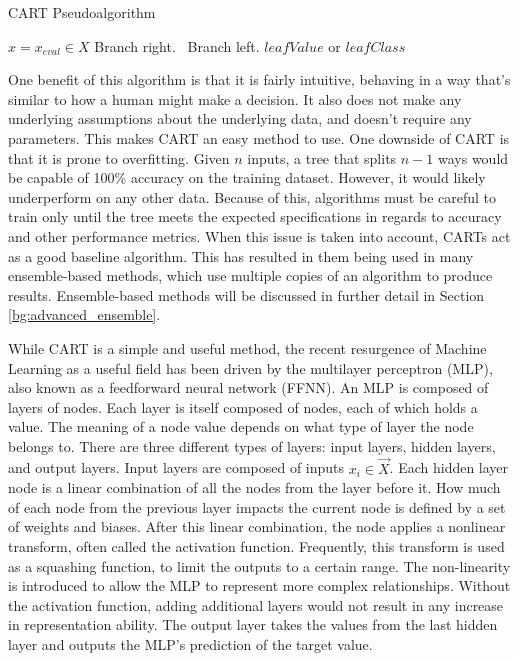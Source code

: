 \documentclass[11pt]{report}
\begin{document}
	\begin{algorithm}[ht]
		\caption{CART Pseudoalgorithm}
		\label{code:bg_cart}
		\begin{algorithmic}[1]
			\State $x = x_{eval} \in X$
			 Branch right.
			\Else \ Branch left.
			\EndIf
			\EndWhile
			\State \Return $leafValue$ or $leafClass$
			\EndProcedure
		\end{algorithmic}
	\end{algorithm}
	\par One benefit of this algorithm is that it is fairly intuitive, behaving in a way that's similar to how a human might make a decision. It also does not make any underlying assumptions about the underlying data, and doesn't require any parameters. This makes CART an easy method to use. One downside of CART is that it is prone to overfitting. Given $n$ inputs, a tree that splits $n-1$ ways would be capable of 100\% accuracy on the training dataset. However, it would likely underperform on any other data. Because of this, algorithms must be careful to train only until the tree meets the expected specifications in regards to accuracy and other performance metrics. When this issue is taken into account, CARTs act as a good baseline algorithm. This has resulted in them being used in many ensemble-based methods, which use multiple copies of an algorithm to produce results. Ensemble-based methods will be discussed in further detail in Section \ref{bg:advanced_ensemble}.
	
	\par While CART is a simple and useful method, the recent resurgence of Machine Learning as a useful field has been driven by the multilayer perceptron (MLP), also known as a feedforward neural network (FFNN). An MLP is composed of layers of nodes. Each layer is itself composed of nodes, each of which holds a value. The meaning of a node value depends on what type of layer the node belongs to. There are three different types of layers: input layers, hidden layers, and output layers. Input layers are composed of inputs $x_i \in \vec{X}$. Each hidden layer node is a linear combination of all the nodes from the layer before it. How much of each node from the previous layer impacts the current node is defined by a set of weights and biases. After this linear combination, the node applies a nonlinear transform, often called the activation function. Frequently, this transform is used as a squashing function, to limit the outputs to a certain range. The non-linearity is introduced to allow the MLP to represent more complex relationships. Without the activation function, adding additional layers would not result in any increase in representation ability. The output layer takes the values from the last hidden layer and outputs the MLP's prediction of the target value. 
	 
\end{document}
